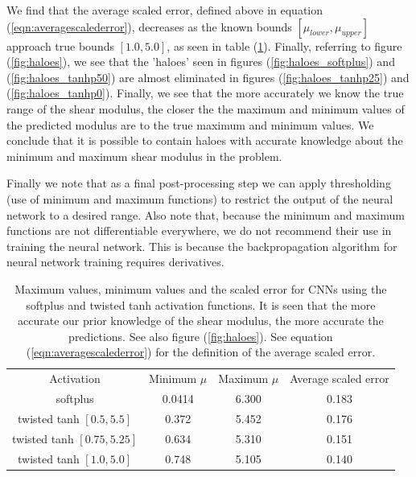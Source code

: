 \documentclass[12pt]{article}
\begin{document}
We find that the average scaled error, defined above in equation (\ref{eqn:averagescalederror}), decreases as the known bounds $[\mu_{lower},\mu_{upper}]$ approach true bounds $[1.0,5.0]$, as seen in table (\ref{table:muminmax}). Finally, referring to figure (\ref{fig:haloes}), we see that the 'haloes' seen in figures (\ref{fig:haloes_softplus}) and (\ref{fig:haloes_tanhp50}) are almost eliminated in figures (\ref{fig:haloes_tanhp25}) and (\ref{fig:haloes_tanhp0}). Finally, we see that the more accurately we know the true range of the shear modulus, the closer the the maximum and minimum values of the predicted modulus are to the true maximum and minimum values. We conclude that it is possible to contain haloes with accurate knowledge about the minimum and maximum shear modulus in the problem.

Finally we note that as a final post-processing step we can apply thresholding (use of minimum and maximum functions) to restrict the output of the neural network to a desired range. Also note that, because the minimum and maximum functions are not differentiable everywhere, we do not recommend their use in training the neural network. This is because the backpropagation algorithm for neural network training requires derivatives.
\begin{table}
  \centering
  \begin{tabular}{|c|c|c|c|}
    \hline
    \multirow{2}{*}{Activation}  & \multirow{2}{*}{Minimum $\mu$} & \multirow{2}{*}{Maximum $\mu$} & \multirow{2}{*}{Average scaled error}\\
                                 &                                &                                &              \\
    \hline
    softplus                 & 0.0414       & 6.300            & 0.183\\
    \hline
    twisted tanh $[0.5, 5.5]$  & 0.372        & 5.452          & 0.176\\     
    \hline
    twisted tanh $[0.75,5.25]$ & 0.634        & 5.310          & 0.151\\
    \hline
    twisted tanh $[1.0, 5.0]$  & 0.748        & 5.105          & 0.140\\
    \hline
  \end{tabular}
  \caption{\label{table:muminmax} Maximum values, minimum values and the scaled error for CNNs using the softplus and twisted tanh activation functions. It is seen that the more accurate our prior knowledge of the shear modulus, the more accurate the predictions. See also figure (\ref{fig:haloes}). See equation (\ref{eqn:averagescalederror}) for the definition of the average scaled error.}
\end{table}
\end{document}

